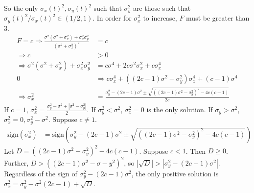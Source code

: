 \documentclass{article}
\begin{document}
So the only $\sigma_x(t)^2,\sigma_y(t)^2$ such that $\sigma_y^2$ are those such that $\sigma_y(t)^2/\sigma_x(t)^2\in\left(1/2,1\right)$. In order for $\sigma_x^2$ to increase, $F$ must be greater than $3$. 
\begin{align*}
F=c \Rightarrow \frac{\sigma^2(\sigma^2+\sigma_x^2)+\sigma_x^2\sigma_y^2}{(\sigma^2+\sigma_x^2)^2}&=c
\\ \Rightarrow c&>0 
\\\Rightarrow \sigma^2(\sigma^2+\sigma_x^2)+\sigma_x^2\sigma_y^2&=c\sigma^4+2c\sigma^2\sigma_x^2+c\sigma_x^4
\\ 0&\Rightarrow c\sigma_x^4+((2c-1)\sigma^2-\sigma_y^2)\sigma_x^4+(c-1)\sigma^4
\\ \Rightarrow \sigma_x^2&=\frac{\sigma_y^2-(2c-1)\sigma^2\pm\sqrt{((2c-1)\sigma^2-\sigma_y^2)^2-4c(c-1)}}{2c}
\end{align*}
If $c=1$, $\sigma_x^2=\frac{\sigma_y^2-\sigma^2\pm|\sigma^2-\sigma_y^2|}{2}$. If $\sigma_y^2<\sigma^2$, $\sigma_x^2=0$ is the only solution. If $\sigma_y>\sigma^2$, $\sigma_x^2=0,\sigma_y^2-\sigma^2$. Suppose $c\neq1$. 
\begin{align*}
\text{sign}(\sigma_x^2)&=\text{sign}\left(\sigma_y^2-(2c-1)\sigma^2\pm\sqrt{((2c-1)\sigma^2-\sigma_y^2)^2-4c(c-1)}\right)
\end{align*}
Let $D=((2c-1)\sigma^2-\sigma_y^2)^2-4c(c-1)$. 
Suppose $c< 1$. Then $D\geq 0$. Further, $D>((2c-1)\sigma^2-\sigma-y^2)^2$, so $|\sqrt{D}|>|\sigma_y^2-(2c-1)\sigma^2|$. Regardless of the sign of $\sigma_y^2-(2c-1)\sigma^2$, the only positive solution is $\sigma_x^2=\sigma_y^2-\sigma^2(2c-1)+\sqrt{D}$.
\end{document}
